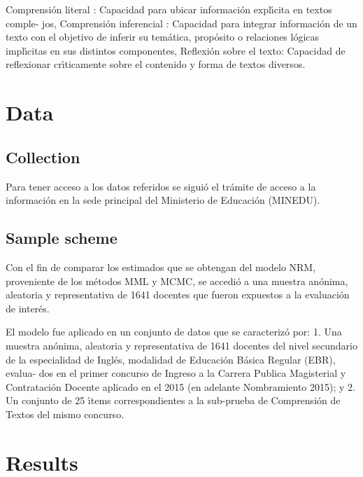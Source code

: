 Comprensión literal : Capacidad para ubicar información explı́cita en textos comple-
jos,
Comprensión inferencial : Capacidad para integrar información de un texto con el
objetivo de inferir su temática, propósito o relaciones lógicas implı́citas en sus distintos
componentes,
Reflexión sobre el texto: Capacidad de reflexionar crı́ticamente sobre el contenido
y forma de textos diversos.


\section{Data}

\subsection{Collection}

Para tener acceso a los datos referidos se siguió el trámite de acceso a la información en
la sede principal del Ministerio de Educación (MINEDU).


\subsection{Sample scheme}

Con el fin de comparar los estimados que se obtengan del modelo NRM, proveniente de
los métodos MML y MCMC, se accedió a una muestra anónima, aleatoria y representativa
de 1641 docentes que fueron expuestos a la evaluación de interés.

El modelo fue aplicado en un conjunto de datos que se caracterizó por:
1. Una muestra anónima, aleatoria y representativa de 1641 docentes del nivel secundario
de la especialidad de Inglés, modalidad de Educación Básica Regular (EBR), evalua-
dos en el primer concurso de Ingreso a la Carrera Publica Magisterial y Contratación
Docente aplicado en el 2015 (en adelante Nombramiento 2015); y
2. Un conjunto de 25 ı́tems correspondientes a la sub-prueba de Comprensión de Textos
del mismo concurso.



\section{Results}

